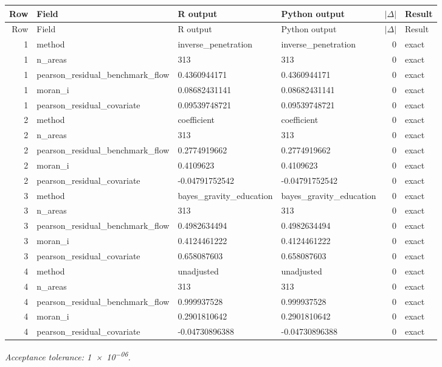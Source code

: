 \documentclass[10pt]{article}
\begin{document}
\small
\begin{longtable}{@{}r p{}p{}p{}rl@{}}
\toprule
Row & Field & R output & Python output & $|\Delta|$ & Result \\
\midrule
\endfirsthead
\toprule
Row & Field & R output & Python output & $|\Delta|$ & Result \\
\midrule
\endhead
1 & method & inverse\_\allowbreak{}penetration & inverse\_\allowbreak{}penetration & 0 & exact \\
1 & n\_\allowbreak{}areas & 313 & 313 & 0 & exact \\
1 & pearson\_\allowbreak{}residual\_\allowbreak{}benchmark\_\allowbreak{}flow & 0.4360944171 & 0.4360944171 & 0 & exact \\
1 & moran\_\allowbreak{}i & 0.08682431141 & 0.08682431141 & 0 & exact \\
1 & pearson\_\allowbreak{}residual\_\allowbreak{}covariate & 0.09539748721 & 0.09539748721 & 0 & exact \\
2 & method & coefficient & coefficient & 0 & exact \\
2 & n\_\allowbreak{}areas & 313 & 313 & 0 & exact \\
2 & pearson\_\allowbreak{}residual\_\allowbreak{}benchmark\_\allowbreak{}flow & 0.2774919662 & 0.2774919662 & 0 & exact \\
2 & moran\_\allowbreak{}i & 0.4109623 & 0.4109623 & 0 & exact \\
2 & pearson\_\allowbreak{}residual\_\allowbreak{}covariate & -0.04791752542 & -0.04791752542 & 0 & exact \\
3 & method & bayes\_\allowbreak{}gravity\_\allowbreak{}education & bayes\_\allowbreak{}gravity\_\allowbreak{}education & 0 & exact \\
3 & n\_\allowbreak{}areas & 313 & 313 & 0 & exact \\
3 & pearson\_\allowbreak{}residual\_\allowbreak{}benchmark\_\allowbreak{}flow & 0.4982634494 & 0.4982634494 & 0 & exact \\
3 & moran\_\allowbreak{}i & 0.4124461222 & 0.4124461222 & 0 & exact \\
3 & pearson\_\allowbreak{}residual\_\allowbreak{}covariate & 0.658087603 & 0.658087603 & 0 & exact \\
4 & method & unadjusted & unadjusted & 0 & exact \\
4 & n\_\allowbreak{}areas & 313 & 313 & 0 & exact \\
4 & pearson\_\allowbreak{}residual\_\allowbreak{}benchmark\_\allowbreak{}flow & 0.999937528 & 0.999937528 & 0 & exact \\
4 & moran\_\allowbreak{}i & 0.2901810642 & 0.2901810642 & 0 & exact \\
4 & pearson\_\allowbreak{}residual\_\allowbreak{}covariate & -0.04730896388 & -0.04730896388 & 0 & exact \\
\bottomrule
\end{longtable}
\normalsize
\textit{Acceptance tolerance: \num{1e-06}.}
\end{document}
